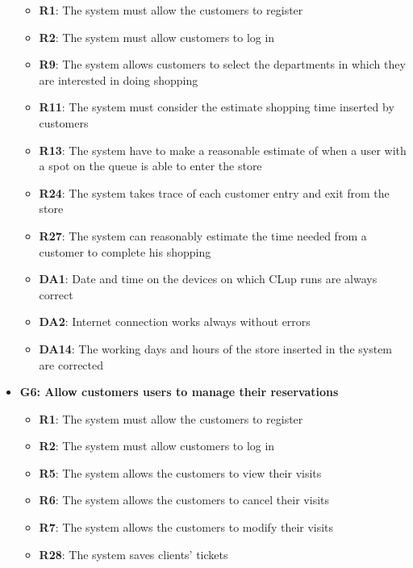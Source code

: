 \documentclass{article}
\begin{document}
\begin{itemize}
					\begin{itemize}
						
						\item {\bfseries R1}: The system must allow the customers to register
						\item {\bfseries R2}: The system must allow customers to log in
						\item {\bfseries R9}: The system allows customers to select the departments in which they are interested in doing shopping
						\item {\bfseries R11}: The system must consider the estimate shopping time inserted by customers
						\item {\bfseries R13}: The system have to make a reasonable estimate of when a user with a spot on the queue is able to enter the store
						\item {\bfseries R24}: The system takes trace of each customer entry and exit from the store
						\item {\bfseries R27}: The system can reasonably estimate the time needed from a customer to complete his shopping 		
						\item {\bfseries DA1}: Date and time on the devices on which CLup runs are always correct
						\item {\bfseries DA2}: Internet connection works always without errors
						\item {\bfseries DA14}: The working days and hours of the store inserted in the system are corrected
						
					\end{itemize}

				\item {\bfseries G6: Allow customers users to manage their reservations}	

					\begin{itemize}
						\item {\bfseries R1}: The system must allow the customers to register
						\item {\bfseries R2}: The system must allow customers to log in
						\item {\bfseries R5}: The system allows the customers to view their visits
						\item {\bfseries R6}: The system allows the customers to cancel their visits
						\item {\bfseries R7}: The system allows the customers to modify their visits
						\item {\bfseries R28}: The system saves clients' tickets \\
		

\end{itemize}
\end{itemize}
\end{document}
